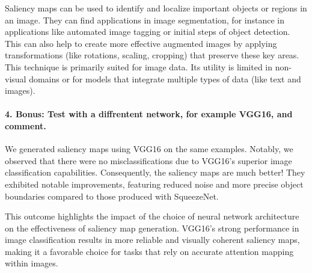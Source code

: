 Saliency maps can be used to identify and localize important objects or regions in an image. They can find applications in image segmentation, for instance in applications like automated image tagging or initial steps of object detection. This can also help to create more effective augmented images by applying transformations (like rotations, scaling, cropping) that preserve these key areas. This technique is primarily suited for image data. Its utility is limited in non-visual domains or for models that integrate multiple types of data (like text and images).


\paragraph*{4. \textbf{Bonus:} Test with a diffrentent network, for example VGG16, and comment.} \label{paragraph:bonus_VGG}

We generated saliency maps using VGG16 on the same examples. Notably, we observed that there were no misclassifications due to VGG16's superior image classification capabilities. Consequently, the saliency maps are much better! They exhibited notable improvements, featuring reduced noise and more precise object boundaries compared to those produced with SqueezeNet.

This outcome highlights the impact of the choice of neural network architecture on the effectiveness of saliency map generation. VGG16's strong performance in image classification results in more reliable and visually coherent saliency maps, making it a favorable choice for tasks that rely on accurate attention mapping within images.


